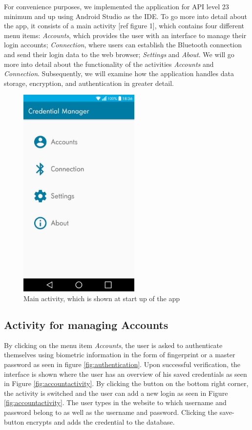 \noindent For convenience purposes, we implemented the application for API level 23 minimum and up using Android Studio as the IDE. To go more into detail about the app, it consists of a main activity [ref figure 1], which contains four different menu items: \textit{Accounts}, which provides the user with an interface to manage their login accounts; \textit{Connection}, where users can establish the Bluetooth connection and send their login data to the web browser; \textit{Settings} and \textit{About}. We will go more into detail about the functionality of the activities \textit{Accounts} and \textit{Connection}. Subsequently, we will examine how the application handles data storage, encryption, and authentication in greater detail. \\

\begin{figure}[H]
\centering
\includegraphics[width=6cm]{images/MainActivity}
\caption[Main activity]{Main activity, which is shown at start up of the app}
\label{fig:mainactivity}
\end{figure}


\subsection{Activity for managing Accounts}
By clicking on the menu item \textit{Accounts}, the user is asked to authenticate themselves using biometric information in the form of fingerprint or a master password as seen in figure \ref{fig:authentication}\protect{}. Upon successful verification, the interface is shown where the user has an overview of his saved credentials as seen in Figure \ref{fig:accountactivity}\protect{}. By clicking the button on the bottom right corner, the activity is switched and the user can add a new login as seen in Figure \ref{fig:accountactivity}\protect{}. The user types in the website to which username and password belong to as well as the username and password. Clicking the save-button encrypts and adds the credential to the database. \\

